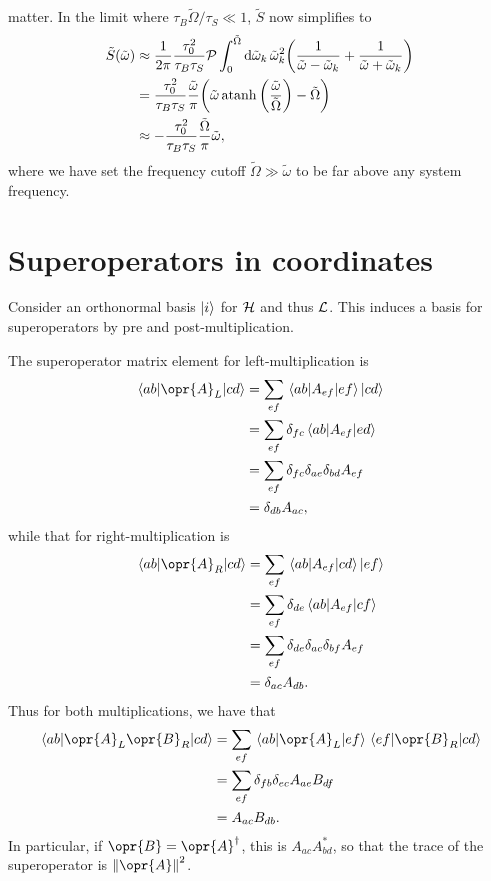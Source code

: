 \documentclass[../thesis.tex]{subfiles}
\begin{document}
matter. In the limit where $\tau_B\tilde{\Omega} / \tau_S \ll 1$, $\tilde{S}$ now
simplifies to
\begin{align}
  \tilde{S}(\tilde{\omega})
  &\approx \frac{1}{2\pi} \frac{\tau_0^2}{\tau_B\tau_S}
  \pv\int_0^{\tilde{\Omega}} \dd{\tilde{\omega}_k} \tilde{\omega}_k^2
  \qty(\frac{1}{\tilde{\omega} - \tilde{\omega}_k}
  + \frac{1}{\tilde{\omega} + \tilde{\omega}_k}) \\
  &= \frac{\tau_0^2}{\tau_B\tau_S} \frac{\tilde{\omega}}{\pi}
  \qty(\tilde{\omega}\atanh\qty(\frac{\tilde{\omega}}{\tilde{\Omega}})
  - \tilde{\Omega}) \\
  &\approx -\frac{\tau_0^2}{\tau_B\tau_S} \frac{\tilde{\Omega}}{\pi}\tilde{\omega},
\end{align}
where we have set the frequency cutoff $\tilde{\Omega} \gg \tilde{\omega}$ to be
far above any system frequency.


\section{Superoperators in coordinates}

Consider an orthonormal basis $\ket{i}$ for $\mathcal{H}$ and thus $\mathcal{L}$. This
induces a basis for superoperators by pre and post-multiplication.

The superoperator matrix element for left-multiplication is
\begin{align}
  \mel{ab}{\opr{A}_L}{cd}
  &= \sum_{ef} \mel{ab}{A_{ef}}{ef}\ket{cd} \\
  &= \sum_{ef} \delta_{fc} \mel{ab}{A_{ef}}{ed} \\
  &= \sum_{ef} \delta_{fc} \delta_{ae} \delta_{bd} A_{ef} \\
  &= \delta_{db} A_{ac},
\end{align}
while that for right-multiplication is
\begin{align}
  \mel{ab}{\opr{A}_R}{cd}
  &= \sum_{ef} \mel{ab}{A_{ef}}{cd}\ket{ef} \\
  &= \sum_{ef} \delta_{de} \mel{ab}{A_{ef}}{cf} \\
  &= \sum_{ef} \delta_{de} \delta_{ac} \delta_{bf} A_{ef} \\
  &= \delta_{ac} A_{db}.
\end{align}
Thus for both multiplications, we have that
\begin{align}
  \mel{ab}{\opr{A}_L\opr{B}_R}{cd}
  &= \sum_{ef} \mel{ab}{\opr{A}_L}{ef}\mel{ef}{\opr{B}_R}{cd} \\
  &= \sum_{ef} \delta_{fb} \delta_{ec} A_{ae} B_{df} \\
  &= A_{ac} B_{db}.
\end{align}
In particular, if $\opr{B} = \opr{A}^\dag$, this is $A_{ac} A_{bd}^*$, so that
the trace of the superoperator is $\norm{\opr{A}}^2$.
\end{document}
